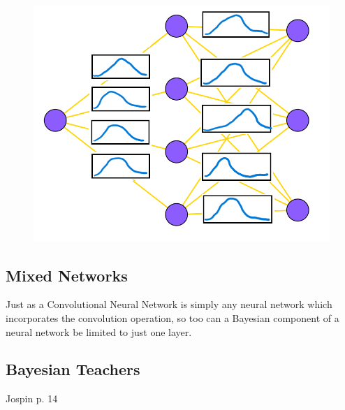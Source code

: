 \begin{figure}[H]
    \centering
    \includegraphics[width = .7\textwidth]{Figures/BNN_weightstoc.png}
\end{figure}

\subsection{Mixed Networks}
Just as a Convolutional Neural Network is simply any neural network which incorporates the convolution operation, so too can a Bayesian component of a neural network be limited to just one layer.

\subsection{Bayesian Teachers}
Jospin p. 14

